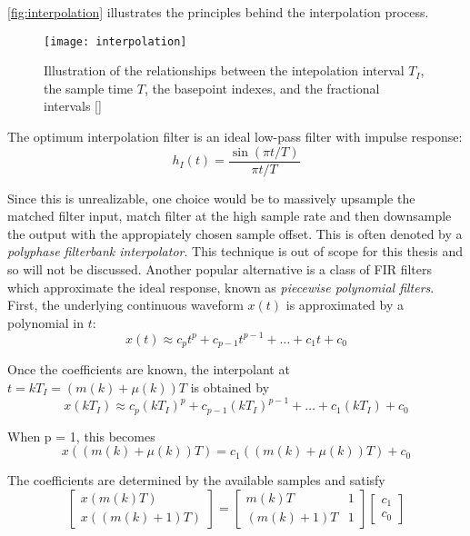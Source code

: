 \autoref{fig:interpolation} illustrates the principles behind the interpolation process.

\begin{figure}[H]
  \centering
  \texttt{[image: interpolation]}
  \caption{Illustration of the relationships between the intepolation interval $T_I$, the sample time $T$, the basepoint indexes, and the fractional intervals [\citeauthor{digcomm_discrete_approach}]}
  \label{fig:interpolation}
\end{figure}

The optimum interpolation filter is an ideal low-pass filter with impulse response:
\begin{equation}
h_I(t)=\frac{\sin(\pi t/T)}{\pi t/T}
\end{equation}

Since this is unrealizable, one choice would be to massively upsample the matched filter input, match filter at the high sample rate and then downsample the output with the appropiately chosen sample offset. This is often denoted by a \emph{polyphase filterbank interpolator}. This technique is out of scope for this thesis and so will not be discussed. Another popular alternative is a class of FIR filters which approximate the ideal response, known as \emph{piecewise polynomial filters}. First, the underlying continuous waveform $x(t)$ is approximated by a polynomial in $t$:
\begin{equation}
x(t)\approx c_pt^p+c_{p-1}t^{p-1}+\ldots+c_1t+c_0
\end{equation}

Once the coefficients are known, the interpolant at $t=kT_I=\left(m(k)+\mu(k)\right)T$ is obtained by
\begin{equation}
x(kT_I)\approx c_p(kT_I)^p+c_{p-1}(kT_I)^{p-1}+\ldots+c_1(kT_I)+c_0
\end{equation}

When p = 1, this becomes
\begin{equation}
x((m(k)+\mu(k))T)=c_1((m(k)+\mu(k))T) + c_0
\end{equation}

The coefficients are determined by the available samples and satisfy
\begin{equation}\begin{bmatrix}
x(m(k)T)\\
x((m(k)+1)T)
\end{bmatrix}
=
\begin{bmatrix}
m(k)T & 1\\
(m(k)+1)T & 1
\end{bmatrix}
\begin{bmatrix}
c_1\\
c_0
\end{bmatrix}
\end{equation}

